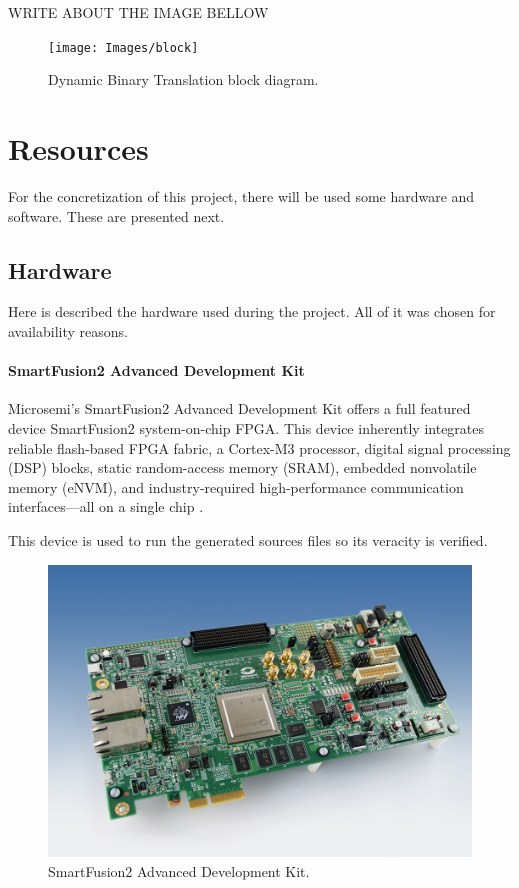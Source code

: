 \documentclass{report}
\begin{document}
	\par WRITE ABOUT THE IMAGE BELLOW
		
	\begin{figure} [!h]
		\centering
		\texttt{[image: Images/block]}
		\caption{Dynamic Binary Translation block diagram.}
		\label{fig:block}
	\end{figure}


	\section{Resources}
	
		\par For the concretization of this project, there will be used some hardware and software. These are presented next.

		\subsection{Hardware}
		
			\par Here is described the hardware used during the project. All of it was chosen for availability reasons. 

			\paragraph{SmartFusion2 Advanced Development Kit}
			
			\par Microsemi's SmartFusion2 Advanced Development Kit offers a full featured device SmartFusion2 system-on-chip FPGA. This device inherently integrates reliable flash-based FPGA fabric, a Cortex-M3 processor, digital signal processing (DSP) blocks, static random-access memory (SRAM), embedded nonvolatile memory (eNVM), and industry-required high-performance communication interfaces—all on a single chip \cite{microsemi}. 
			\par This device is used to run the generated sources files so its veracity is verified. 
			
			\begin{figure} [!h]
				\centering
				\includegraphics[width=0.5\linewidth]{Images/microsemi}
				\caption{SmartFusion2 Advanced Development Kit.}
				\label{fig:microsemi}
			\end{figure}
\end{document}
